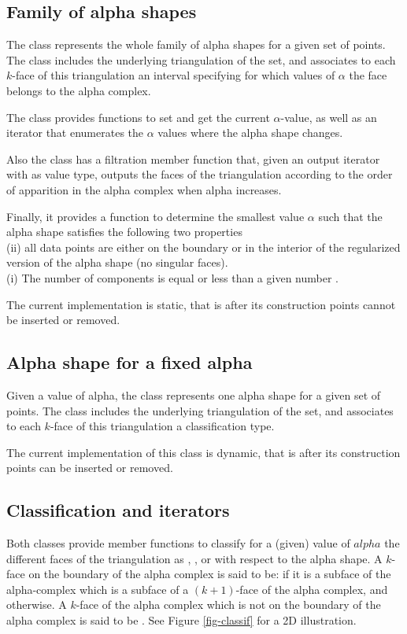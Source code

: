 \subsection{Family of alpha shapes}

The class  represents the whole
family of alpha shapes for a given set of points.
The class includes  the underlying triangulation 
of the set,  and associates to each $k$-face of this triangulation
 an interval specifying 
for which values of $\alpha$ the face belongs to the
alpha complex. 

The class provides functions to set and
get the current $\alpha$-value, as well as an iterator that enumerates
the $\alpha$ values where the alpha shape changes.

Also the class has a filtration member function that, given
an  output iterator with 
as value  type, outputs the faces of the triangulation 
according to the 
order of apparition in the alpha complex when alpha increases.
  

Finally, it provides a function to determine 
the smallest value $\alpha$
such that the alpha shape   satisfies the following two properties~\\
(ii) all data points are either on the boundary or in the interior 
   of the regularized version of the alpha shape  (no singular faces). \\
(i) The number of components is equal or less  than a given  number .

\smallskip
The current implementation is static, that is after its construction
points cannot be inserted or removed.

\subsection{Alpha shape for a fixed alpha}
Given a value of alpha, the class  represents one 
alpha shape for a given set of points.
The class includes  the underlying triangulation 
of the set,  and associates to each $k$-face of this triangulation
a classification type. 

\smallskip
The current implementation of this class is dynamic, that is after its construction
points can be inserted or removed.

\subsection{Classification and iterators}
Both classes provide member functions to classify for a (given) value
of $alpha$ the different faces of the triangulation as
, ,  or 
 with respect
to the alpha shape. A $k$-face  on the boundary of the alpha complex
is said to be:  if it is a subface of the alpha-complex which
is a subface of a $(k+1)$-face of the alpha complex, and  otherwise.
A $k$-face of the alpha complex which is not on the boundary of the alpha complex
is said to be . See Figure \ref{fig-classif} for a 2D illustration.


